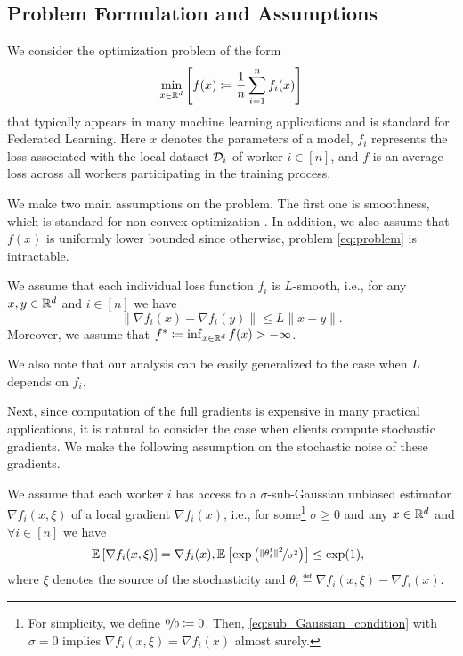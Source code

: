 \documentclass[a4paper,11pt]{article}
\begin{document}
\subsection{Problem Formulation and Assumptions}

We consider the optimization problem of the form
\begin{equation}\label{eq:problem}
\min\limits_{x\in\mathbb{R}^d} \left[f(x) \coloneqq \frac{1}{n}\sum_{i=1}^nf_i(x)\right]
\end{equation}
that typically appears in many machine learning applications and is standard for Federated Learning. Here $x$ denotes the parameters of a model, $f_i$ represents the loss associated with the local dataset $\mathcal{D}_i$ of worker $i\in[n]$, and $f$ is an average loss across all workers participating in the training process.

We make two main assumptions on the problem. The first one is smoothness, which is standard for non-convex optimization \citep{carmon2020lower, danilova2022recent}. In addition, we also assume that $f(x)$ is uniformly lower bounded since otherwise, problem \eqref{eq:problem} is intractable.
\begin{assumption}\label{asmp:smoothness}
    We assume that each individual loss function $f_i$ is $L$-smooth, i.e., for any $x,y\in\mathbb{R}^d$ and $i\in[n]$ we have 
    \begin{equation}
        \|\nabla f_i(x) -\nabla f_i(y)\| \le L\|x-y\|.
    \end{equation}
    Moreover, we assume that $f^* \coloneqq \inf_{x\in\mathbb{R}^d}f(x) > -\infty$.
\end{assumption}
We also note that our analysis can be easily generalized to the case when $L$ depends on $f_i$. 

Next, since computation of the full gradients is expensive in many practical applications, it is natural to consider the case when clients compute stochastic gradients. We make the following assumption on the stochastic noise of these gradients.
\begin{assumption}\label{asmp:batch_noise}
    We assume that each worker $i$ has access to a $\sigma$-sub-Gaussian unbiased estimator $\nabla f_i(x,\xi)$ of a local gradient  $\nabla f_i(x)$, i.e., for some\footnote{For simplicity, we define $\nicefrac{0}{0}\coloneqq 0$. Then, \eqref{eq:sub_Gaussian_condition} with $\sigma = 0$ implies $\nabla f_i(x,\xi) = \nabla f_i(x)$ almost surely.} $\sigma \geq 0$ and any $x \in \mathbb{R}^d$ and $\forall i\in[n]$ we have 
    \begin{align}
        \hspace{-5pt}\E{\nabla f_i(x,\xi)} = \nabla f_i(x), \E{\exp\left(\nicefrac{\|\theta_i^t\|^2}{\sigma^2}\right)} \leq \exp(1), \label{eq:sub_Gaussian_condition}%
    \end{align}
    where $\xi$ denotes the source of the stochasticity and $\theta_i \eqdef \nabla f_i(x,\xi) - \nabla f_i(x)$.
\end{assumption}
\end{document}
